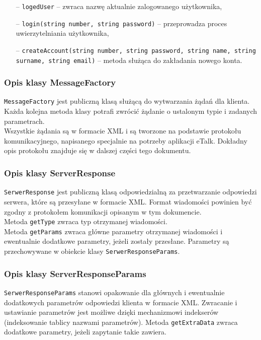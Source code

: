 \documentclass[a4paper,12pt]{article}
\begin{document}
\begin{itemize}
    \item[--] \texttt{logedUser} -- zwraca nazwę aktualnie zalogowanego użytkownika,
    \item[--] \texttt{login(string number, string password)} -- przeprowadza proces uwierzytelniania użytkownika,
    \item[--] \texttt{createAccount(string number, string password, string name, string surname, string email)} -- metoda służąca do zakładania nowego konta.
\end{itemize}


\subsubsection[Opis klasy MessageFactory]{Opis klasy MessageFactory}
\texttt{MessageFactory} jest publiczną klasą służącą do wytwarzania żądań dla klienta.\\
Każda kolejna metoda klasy potrafi zwrócić żądanie o ustalonym typie i zadanych parametrach.\\
Wszystkie żądania są w formacie XML i są tworzone na podstawie protokołu komunikacyjnego, napisanego specjalnie na potrzeby aplikacji eTalk. Dokładny opis protokołu znajduje się w dalszej części tego dokumentu.

\subsubsection[Opis klasy ServerResponse]{Opis klasy ServerResponse}
\texttt{SerwerResponse} jest publiczną klasą odpowiedzialną za przetwarzanie odpowiedzi serwera, które są przesyłane w formacie XML.
Format wiadomości powinien być zgodny z protokołem komunikacji opisanym w tym dokumencie.\\
Metoda \texttt{getType} zwraca typ otrzymanej wiadomości.\\
Metoda \texttt{getParams} zwraca główne parametry otrzymanej wiadomości i ewentualnie dodatkowe parametry, jeżeli zostały przesłane. Parametry są przechowywane w obiekcie klasy \texttt{SerwerResponseParams}.

\subsubsection[Opis klasy ServerResponseParams]{Opis klasy ServerResponseParams}
\texttt{SerwerResponseParams} stanowi opakowanie dla głównych i ewentualnie dodatkowych parametrów odpowiedzi klienta w formacie XML. Zwracanie i ustawianie parametrów jest możliwe dzięki mechanizmowi indekserów (indeksowanie tablicy nazwami parametrów).
Metoda \texttt{getExtraData} zwraca dodatkowe parametry, jeżeli zapytanie takie zawiera.
\end{document}
